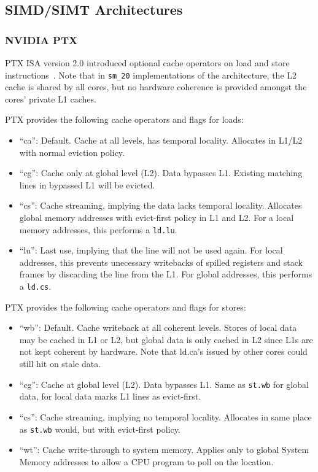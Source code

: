 \subsection{SIMD/SIMT Architectures}

\subsubsection{NVIDIA PTX}

PTX ISA version 2.0 introduced optional cache operators on load and store instructions~\cite{prx2}.
Note that in \verb=sm_20= implementations of the architecture, the L2 cache is shared by all cores,
but no hardware coherence is provided amongst the cores' private L1 caches.

PTX provides the following cache operators and flags for loads:
\begin{itemize}
\item ``ca'':  Default. Cache at all levels, has temporal locality. Allocates in L1/L2 with normal eviction policy.
\item ``cg'': Cache only at global level (L2). Data bypasses L1. Existing matching lines in bypassed L1 will be evicted.
\item ``cs'': Cache streaming, implying the data lacks temporal locality. Allocates global memory addresses with evict-first policy in L1 and L2. For a local memory addresses, this performs a \verb=ld.lu=.
\item ``lu'': Last use, implying that the line will not be used again. For local addresses, this prevents unecessary writebacks of spilled registers and stack frames by discarding the line from the L1. For global addresses, this performs a \verb=ld.cs=.
\end{itemize}

PTX provides the following cache operators and flags for stores:
\begin{itemize}
\item ``wb'': Default. Cache writeback at all coherent levels. Stores of local data may be cached in L1 or L2, but global data is only cached in L2 since L1s are not kept coherent by hardware. Note that ld.ca's issued by other cores could still hit on stale data.
\item ``cg'': Cache at global level (L2). Data bypasses L1. Same as \verb=st.wb= for global data, for local data marks L1 lines as evict-first.
\item ``cs'': Cache streaming, implying no temporal locality. Allocates in same place as \verb=st.wb= would, but with evict-first policy.
\item ``wt'': Cache write-through to system memory. Applies only to global System Memory addresses to allow a CPU program to poll on the location.
\end{itemize}

